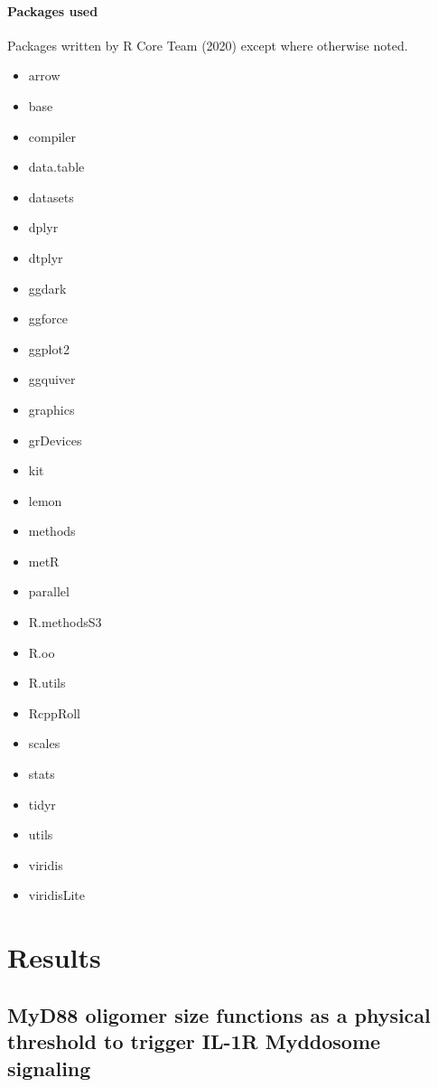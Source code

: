 \subsection{Packages used}
Packages written by R Core Team (2020) except where otherwise noted.
\begin{itemize}
\item arrow \autocite{Richardson_2021}
\item base
\item compiler
\item data.table \autocite{Dowle_2021}
\item datasets
\item dplyr \autocite{Wickham_Dplyr}
\item dtplyr \autocite{Wickham_Dtplyr}
\item ggdark \autocite{Grantham_2019}
\item ggforce \autocite{Pedersen_2021}
\item ggplot2 \autocite{Wickham_2016}
\item ggquiver \autocite{OHara-Wild_2021}
\item graphics
\item grDevices
\item kit \autocite{Jacob_2022}
\item lemon \autocite{McKinnonEdwards_2020}
\item methods
\item metR \autocite{Campitelli_2018}
\item parallel
\item R.methodsS3
\item R.oo \autocite{Bengtsson_2003}
\item R.utils \autocite{Bengtsson_2021}
\item RcppRoll \autocite{Ushey_2018}
\item scales \autocite{Wickham_2020}
\item stats
\item tidyr \autocite{Wickham_Tidyr}
\item utils
\item viridis \autocite{Garnier_2021}
\item viridisLite \autocite{Garnier_2021}
\end{itemize}

\mygeometry
\part{Results}
\restoregeometry
\chapter{MyD88 oligomer size functions as a physical threshold to trigger IL-1R Myddosome signaling}
\label{chapter:p1}
